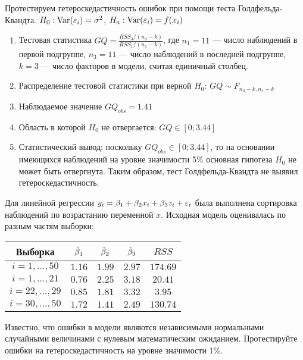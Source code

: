 \documentclass[pdftex,11pt,openany]{book}\usepackage[]{graphicx}\usepackage[]{color}
\begin{document}
\begin{solution}
Протестируем гетероскедастичность ошибок при помощи теста Голдфельда-
Квандта. $H_0: \operatorname{Var}(\varepsilon_i)=\sigma^2$, $H_a: \operatorname{Var}(\varepsilon_i)=f(x_i)$

\begin{enumerate}
\item Тестовая статистика $GQ=\frac{RSS_3/(n_3-k)}{RSS_1/(n_1-k)}$, где $n_1=11$ --- число наблюдений в первой подгруппе, $n_3=11$ --- число наблюдений в
последней подгруппе, $k=3$ --- число факторов в модели, считая единичный столбец.
\item Распределение тестовой статистики при верной $H_0$: $GQ\sim F_{n_3-k,n_1-k}$
\item Наблюдаемое значение $GQ_{obs}=1.41$
\item Область в которой $H_0$ не отвергается: $GQ\in [0;3.44]$
\item Статистический вывод: поскольку $GQ_{obs} \in [0;3.44]$, то на основании имеющихся наблюдений на уровне значимости 5\% основная гипотеза $H_0$ не может быть отвергнута. Таким образом, тест Голдфельда-Квандта не выявил гетероскедастичность.
\end{enumerate} 
\end{solution}


\begin{problem}
Для линейной регрессии $y_i = \beta_1 + \beta_2 x_i + \beta_3 z_i + \varepsilon_i$ была
выполнена сортировка наблюдений по возрастанию переменной $x$. Исходная модель оценивалась по разным частям выборки:

\begin{tabular}{c|cccc}
Выборка & $\hat{\beta}_1$ & $\hat{\beta}_2$ & $\hat{\beta}_3$ & $RSS$ \\
\hline 
$i=1,\ldots, 50$ & $1.16$ & $1.99$ & $2.97$ & $174.69$ \\ 
$i=1,\ldots, 21$ & $0.76$ & $2.25$ & $3.18$ & $20.41$ \\ 
$i=22,\ldots, 29$ & $0.85$ & $1.81$ & $3.32$ & $3.95$ \\ 
$i=30,\ldots, 50$ & $1.72$ & $1.41$ & $2.49$ & $130.74$ \\ 
\end{tabular} 

Известно, что ошибки в модели являются независимыми нормальными случайными величинами с нулевым математическим ожиданием. Протестируйте
ошибки на гетероскедастичность на уровне значимости 1\%.
\end{problem}
\end{document}
